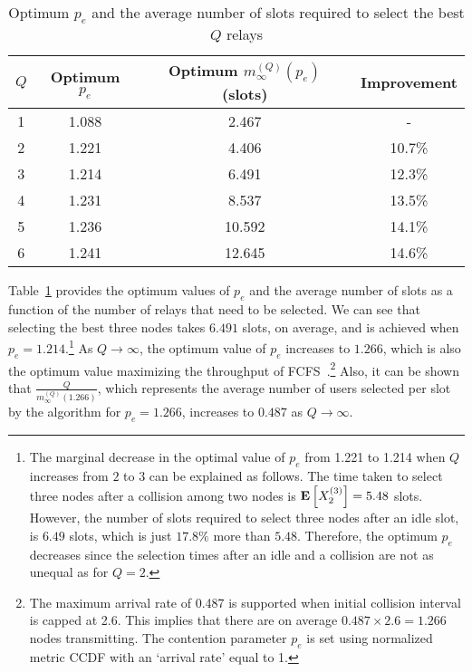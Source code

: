 \documentclass[12pt,draftcls,peerreview, onecolumn]{IEEEtran}
\newcommand{\tendsto}{\to}
\newcommand{\expect}[1]{{\bf E}\left[{#1}\right]}
\newcommand{\EXQ}[2]{\expect{X_{#1}^{(#2)}}}
\newcommand{\aveslotsQ}[2]{m_{#1}^{(#2)}}
\begin{document}
\begin{table}[p]
\renewcommand{\arraystretch}{1.2}
\caption{Optimum $p_e$ and the average number of slots required to select the best $Q$ relays}
\centering
\begin{tabular}{| c | c | c | c |}
\hline
        $Q$ & Optimum $p_e$ & Optimum $\aveslotsQ{\infty}{Q}(p_e)$ (slots) & Improvement\\
        \hline
        1 & 1.088 & 2.467 & - \\
        2 & 1.221 & 4.406 & 10.7\% \\
        3 & 1.214 & 6.491 & 12.3\% \\
        4 & 1.231 & 8.537 & 13.5\% \\
        5 & 1.236 & 10.592 & 14.1\% \\
        6 & 1.241 & 12.645 & 14.6\% \\
        \hline
\end{tabular}
\label{table:optimum p_e}
\end{table}


Table~\ref{table:optimum p_e} provides the optimum values of $p_e$ and
the average number of slots as a function of the number of relays that
need to be selected. We can see that selecting the best three nodes
takes $6.491$ slots, on average, and is achieved when $p_e =
1.214$.\footnote{The marginal decrease in the optimal value of $p_e$
  from 1.221 to 1.214 when $Q$ increases from $2$ to $3$ can be
  explained as follows.  The time taken to select three nodes after a
  collision among two nodes is $\EXQ{2}{3}=5.48$ slots. However, the
  number of slots required to select three nodes after an idle slot,
  is $6.49$ slots, which is just $17.8\%$ more than $5.48$. Therefore,
  the optimum $p_e$ decreases since the selection times after an idle
  and a collision are not as unequal as for $Q = 2$.} As $Q \tendsto
\infty$, the optimum value of $p_e$ increases to $1.266$, which is
also the optimum value maximizing the throughput of
FCFS~\cite{bertsekas_gallager}.\footnote{The maximum arrival rate of
  0.487 is supported when initial collision interval is capped at 2.6.
  This implies that there are on average $0.487 \times 2.6 = 1.266$
  nodes transmitting.  The contention parameter $p_e$ is set using
  normalized metric CCDF with an `arrival rate' equal to 1.}  Also, it
can be shown that $\frac{Q}{\aveslotsQ{\infty}{Q}(1.266)}$, which
represents the average number of users selected per slot by the
algorithm for $p_e=1.266$, increases to $0.487$ as $Q \tendsto
\infty$.
\end{document}

